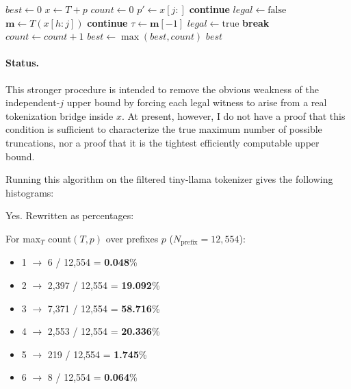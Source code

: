 \begin{algorithm}[H]
\caption{A Stricter Upper Bound on the Number of Possible Truncations}
\begin{algorithmic}[1]
\State $best \gets 0$
        \State $x \gets T + p$
        \State $count \gets 0$
            \State $p' \gets x[j:]$
                \State \textbf{continue}
            \EndIf
            \State $legal \gets \mathrm{false}$
                \State $\mathbf{m} \gets T(x[h:j])$
                    \State \textbf{continue}
                \EndIf
                \State $\tau \gets \mathbf{m}[-1]$
                    \State $legal \gets \mathrm{true}$
                    \State \textbf{break}
                \EndIf
            \EndFor
                \State $count \gets count + 1$
            \EndIf
        \EndFor
        \State $best \gets \max(best, count)$
    \EndFor
\EndFor
\State \Return $best$
\end{algorithmic}
\end{algorithm}

\paragraph{Status.}
This stronger procedure is intended to remove the obvious weakness of the
independent-$j$ upper bound by forcing each legal witness to arise from a real
tokenization bridge inside $x$. At present, however, I do not have a proof
that this condition is sufficient to characterize the true maximum number of
possible truncations, nor a proof that it is the tightest efficiently
computable upper bound.

Running this algorithm on the filtered tiny-llama tokenizer gives the following histograms:

Yes. Rewritten as percentages:

For max$_T$ count$(T, p)$ over prefixes $p$ ($N_{\text{prefix}} = 12,\!554$):

\begin{itemize}
    \item 1 $\to$ 6 / 12,554 = \textbf{0.048}\%
    \item 2 $\to$ 2,397 / 12,554 = \textbf{19.092}\%
    \item 3 $\to$ 7,371 / 12,554 = \textbf{58.716}\%
    \item 4 $\to$ 2,553 / 12,554 = \textbf{20.336}\%
    \item 5 $\to$ 219 / 12,554 = \textbf{1.745}\%
    \item 6 $\to$ 8 / 12,554 = \textbf{0.064}\%
\end{itemize}

